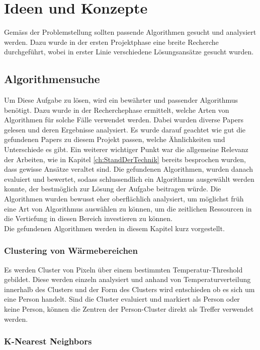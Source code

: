 \chapter{Ideen und Konzepte}
\label{ch:ideasAndConcepts}

Gemäss der Problemstellung sollten passende Algorithmen gesucht und analysiert werden. Dazu wurde in der ersten Projektphase eine breite Recherche durchgeführt, wobei in erster Linie verschiedene Lösungsansätze gesucht wurden.

\section{Algorithmensuche}

Um Diese Aufgabe zu lösen, wird ein bewährter und passender Algorithmus benötigt. Dazu wurde in der Recherchephase ermittelt, welche Arten von Algorithmen für solche Fälle verwendet werden. Dabei wurden diverse Papers gelesen und deren Ergebnisse analysiert. Es wurde darauf geachtet wie gut die gefundenen Papers zu diesem Projekt passen, welche Ähnlichkeiten und Unterschiede es gibt. Ein weiterer wichtiger Punkt war die allgemeine Relevanz der Arbeiten, wie in Kapitel \ref{ch:StandDerTechnik} bereits besprochen wurden, dass gewisse Ansätze veraltet sind.
Die gefundenen Algorithmen, wurden danach evaluiert und bewertet, sodass schlussendlich ein Algorithmus ausgewählt werden konnte, der bestmöglich zur Lösung der Aufgabe beitragen würde. Die Algorithmen wurden bewusst eher oberflächlich analysiert, um möglichst früh eine Art von Algorithmus auswählen zu können, um die zeitlichen Ressourcen in die Vertiefung in diesen Bereich investieren zu können.\\
Die gefundenen Algorithmen werden in diesem Kapitel kurz vorgestellt.

\subsection{Clustering von Wärmebereichen}

Es werden Cluster von Pixeln über einem bestimmten Temperatur-Threshold gebildet. Diese werden einzeln analysiert und anhand von Temperaturverteilung innerhalb des Clusters und der Form des Clusters wird entschieden ob es sich um eine Person handelt. Sind die Cluster evaluiert und markiert als Person oder keine Person, können die Zentren der Person-Cluster direkt als Treffer verwendet werden.


\subsection{K-Nearest Neighbors}

